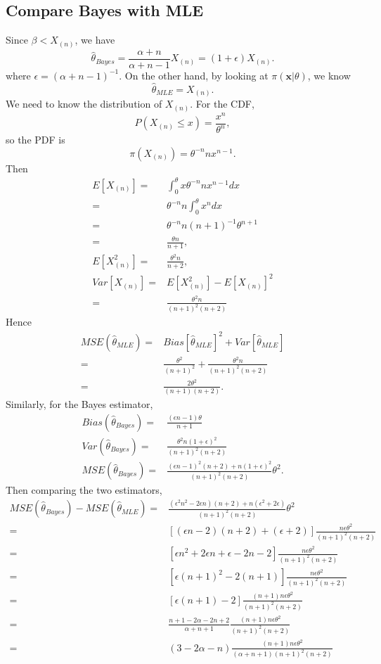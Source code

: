 \documentclass[12pt]{article}
\begin{document}
\subsection{Compare Bayes with MLE}

Since $\beta < X_{(n)}$, we have
\[
  \hat{\theta}_{Bayes} = \frac{\alpha+n}{\alpha+n-1} X_{(n)} = (1+\epsilon) X_{(n)}.
\]
where $\epsilon = (\alpha + n -1)^{-1}$.
On the other hand, by looking at $\pi(\bm{x} | \theta)$,
we know
\[
  \hat{\theta}_{MLE} = X_{(n)}.
\]
We need to know the distribution of $X_{(n)}$.
For the CDF,
\[
  P(X_{(n)} \leq x) = \frac{x^n}{\theta^n},
\]
so the PDF is
\[
  \pi(X_{(n)}) = \theta^{-n} n x^{n-1}.
\]
Then
\begin{align*}
  E[X_{(n)}]
  = & \int_0^\theta x \theta^{-n} n x^{n-1} dx \\
  = & \theta^{-n} n \int_0^\theta x^{n} dx \\
  = & \theta^{-n} n (n+1)^{-1} \theta^{n+1}\\
  = & \frac{\theta n}{n+1}, \\
  E[X_{(n)}^2]
  = & \frac{\theta^2 n}{n+2}, \\
  Var[X_{(n)}]
  = & E[X_{(n)}^2] - E[X_{(n)}]^2 \\
  = & \frac{\theta^2 n}{(n+1)^2(n+2)}
\end{align*}
Hence
\begin{align*}
  MSE(\hat{\theta}_{MLE}) =
  & Bias[\hat{\theta}_{MLE}]^2 + Var[\hat{\theta}_{MLE}] \\
  = & \frac{\theta^2}{(n+1)^2} + \frac{\theta^2 n}{(n+1)^2(n+2)} \\
  = & \frac{2 \theta^2}{(n+1)(n+2)}.
\end{align*}
Similarly, for the Bayes estimator,
\begin{align*}
  Bias(\hat{\theta}_{Bayes})
  = & \frac{(\epsilon n - 1)\theta}{n+1} \\
  Var(\hat{\theta}_{Bayes})
  = & \frac{\theta^2 n (1+\epsilon)^2}{(n+1)^2(n+2)} \\
  MSE(\hat{\theta}_{Bayes})
  = & \frac{(\epsilon n - 1)^2(n+2) + n(1+\epsilon)^2}{(n+1)^2(n+2)} \theta^2.
\end{align*}
Then comparing the two estimators,
\begin{align*}
  MSE(\hat{\theta}_{Bayes}) - MSE(\hat{\theta}_{MLE}) 
  = & \frac{(\epsilon^2 n^2 - 2\epsilon n)(n+2) + n(\epsilon^2 + 2\epsilon)}{(n+1)^2(n+2)} \theta^2 \\
  = & [(\epsilon n - 2)(n+2) + (\epsilon + 2)] \frac{n \epsilon\theta^2}{(n+1)^2(n+2)} \\
  = & [\epsilon n^2 + 2\epsilon n + \epsilon -2n -2 ] \frac{n \epsilon\theta^2}{(n+1)^2(n+2)} \\
  = & [\epsilon (n+1)^2 -2(n+1)] \frac{n \epsilon\theta^2}{(n+1)^2(n+2)} \\
  = & [\epsilon (n+1) -2] \frac{(n+1)n \epsilon\theta^2}{(n+1)^2(n+2)} \\
  = & \frac{n+1-2\alpha-2n+2}{\alpha+n+1} \frac{(n+1)n \epsilon\theta^2}{(n+1)^2(n+2)} \\
  = & (3-2\alpha-n) \frac{(n+1)n \epsilon\theta^2}{(\alpha+n+1)(n+1)^2(n+2)} 
\end{align*}
\end{document}
